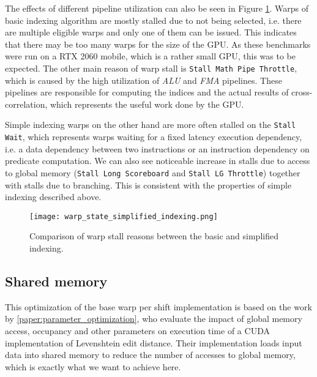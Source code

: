 The effects of different pipeline utilization can also be seen in Figure \ref{fig:warp_state_simplified_indexing}. Warps of basic indexing algorithm are mostly stalled due to not being selected, i.e. there are multiple eligible warps and only one of them can be issued. This indicates that there may be too many warps for the size of the GPU. As these benchmarks were run on a RTX 2060 mobile, which is a rather small GPU, this was to be expected. The other main reason of warp stall is \texttt{Stall Math Pipe Throttle}, which is caused by the high utilization of \textit{ALU} and \textit{FMA} pipelines. These pipelines are responsible for computing the indices and the actual results of cross-correlation, which represents the useful work done by the GPU.

Simple indexing warps on the other hand are more often stalled on the \texttt{Stall Wait}, which represents warps waiting for a fixed latency execution dependency, i.e. a data dependency between two instructions or an instruction dependency on predicate computation. We can also see noticeable increase in stalls due to access to global memory (\texttt{Stall Long Scoreboard} and \texttt{Stall LG Throttle}) together with stalls due to branching. This is consistent with the properties of simple indexing described above.

\begin{figure}[ht]
	\centering
	\texttt{[image: warp\_state\_simplified\_indexing.png]}
	\caption{Comparison of warp stall reasons between the basic and simplified indexing.}
	\label{fig:warp_state_simplified_indexing}
\end{figure}

\subsection{Shared memory}
\label{sec:warp_per_shift_shared_mem}

This optimization of the base warp per shift implementation is based on the work by \ref{paper:parameter_optimization}, who evaluate the impact of global memory access, occupancy and other parameters on execution time of a CUDA implementation of Levenshtein edit distance. Their implementation loads input data into shared memory to reduce the number of accesses to global memory, which is exactly what we want to achieve here.

